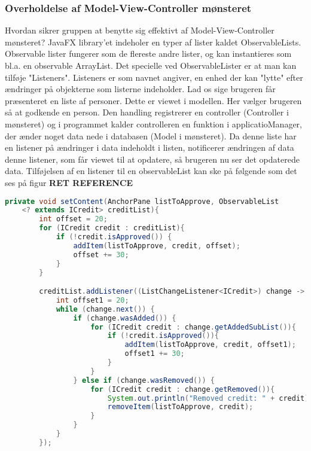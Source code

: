 \subsubsection{Overholdelse af Model-View-Controller mønsteret} Hvordan sikrer gruppen at benytte sig effektivt af Model-View-Controller mønsteret? 
JavaFX library'et indeholer en typer af lister kaldet ObservableLists. Observable lister fungerer som de flereste andre lister, og kan instantieres som bl.a. en observable ArrayList. Det specielle ved ObservableLister er at man kan tilføje "Listeners". Listeners er som navnet angiver, en enhed der kan "lytte" efter ændringer på objekterne som listerne indeholder. Lad os sige brugeren får præsenteret en liste af personer. Dette er viewet i modellen. Her vælger brugeren så at godkende en person. Den handling registrerer en controller (Controller i mønsteret) og i programmet kalder controlleren en funktion i applicatioManager, der ænder noget data nede i databasen (Model i mønsteret). Da denne liste har en listener på ændringer i data indeholdt i listen, notificerer ændringen af data denne listener, som får viewet til at opdatere, så brugeren nu ser det opdaterede data.
Tilføjelsen af en listener til en observableList kan ske på følgende som det ses på figur \textbf{RET REFERENCE}


 


\begin{lstlisting}[language=Java, label=lst:setContent, caption = set]
    private void setContent(AnchorPane listToApprove, ObservableList
    <? extends ICredit> creditList){
        int offset = 20;
        for (ICredit credit : creditList){
            if (!credit.isApproved()) {
                addItem(listToApprove, credit, offset);
                offset += 30;
            }
        }

        creditList.addListener((ListChangeListener<ICredit>) change -> {
            int offset1 = 20;
            while (change.next()) {
                if (change.wasAdded()) {
                    for (ICredit credit : change.getAddedSubList()){
                        if (!credit.isApproved()){
                            addItem(listToApprove, credit, offset1);
                            offset1 += 30;
                        }
                    }
                } else if (change.wasRemoved()) {
                    for (ICredit credit : change.getRemoved()){
                        System.out.println("Removed credit: " + credit);
                        removeItem(listToApprove, credit);
                    }
                }
            }
        });
\end{lstlisting}




